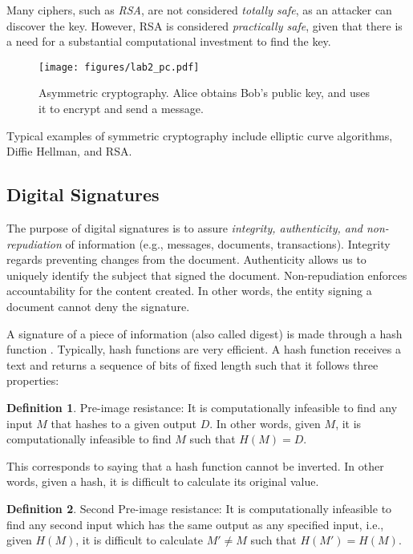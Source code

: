 \documentclass[12pt,a4paper]{article}
\theoremstyle{definition}
\newtheorem{definition}{Definition}[section]
\begin{document}
Many ciphers, such as \emph{RSA}, are not considered \emph{totally safe}, as an attacker can discover the key. However, RSA is considered \emph{practically safe}, given that there is a need for a substantial computational investment to find the key.

\begin{figure}[h]
\centering
\texttt{[image: figures/lab2\_pc.pdf]}
\caption{Asymmetric cryptography. Alice obtains Bob's public key, and uses it to encrypt and send a message.}
\label{fig:pc}
\end{figure}

Typical examples of symmetric cryptography include elliptic curve algorithms, Diffie Hellman, and RSA.

\subsection{Digital Signatures}
The purpose of digital signatures is to assure \emph{integrity, authenticity, and non-repudiation} of information (e.g., messages, documents, transactions). Integrity regards preventing changes from the document. Authenticity allows us to uniquely identify the subject that signed the document. Non-repudiation enforces accountability for the content created. In other words, the entity signing a document cannot deny the signature.

A signature of a piece of information (also called digest) is made through a hash function \cite{rogaway2004}. Typically, hash functions are very efficient. A hash function receives a text and returns a sequence of bits of fixed length such that it follows three properties:

\theoremstyle{definition}
\begin{definition}{Pre-image resistance:}
It is computationally infeasible to find any input $M$ that hashes to a given output $D$. In other words, given $M$, it is computationally infeasible to find $M$ such that $H(M) = D$.

\end{definition}


This corresponds to saying that a hash function cannot be inverted. In other words, given a hash, it is difficult to calculate its original value.


\theoremstyle{definition}
\begin{definition}{Second Pre-image resistance:}
It is computationally infeasible to find any second input which has the same output as any specified input, i.e., given $H(M)$, it is difficult to calculate $M' \neq M$ such that $H(M') = H(M)$.

\end{definition}
\end{document}
